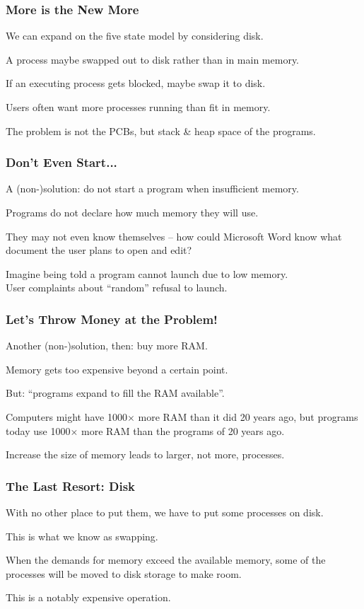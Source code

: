 \begin{frame}
\frametitle{More is the New More}

We can expand on the five state model by considering disk.

A process maybe swapped out to disk rather than in main memory.

If an executing process gets blocked, maybe swap it to disk.

Users often want more processes running than fit in memory.

The problem is not the PCBs, but stack \& heap space of the programs.

\end{frame}

\begin{frame}
\frametitle{Don't Even Start...}

A (non-)solution: do not start a program when insufficient memory.

Programs do not declare how much memory they will use.

They may not even know themselves -- how could Microsoft Word know what document the user plans to open and edit?

Imagine being told a program cannot launch due to low memory.\\
\quad User complaints about ``random'' refusal to launch.

\end{frame}

\begin{frame}
\frametitle{Let's Throw Money at the Problem!}

Another (non-)solution, then: buy more RAM. 

Memory gets too expensive beyond a certain point.

But: ``programs expand to fill the RAM available''.

Computers might have 1000$\times$ more RAM than it did 20 years ago, but programs today use 1000$\times$ more RAM than the programs of 20 years ago. 

Increase the size of memory leads to larger, not more, processes.

\end{frame}

\begin{frame}
\frametitle{The Last Resort: Disk}

With no other place to put them, we have to put some processes on disk.

This is what we know as \alert{swapping}.

When the demands for memory exceed the available memory, some of the processes will be moved to disk storage to make room. 

This is a notably expensive operation.
\end{frame}

